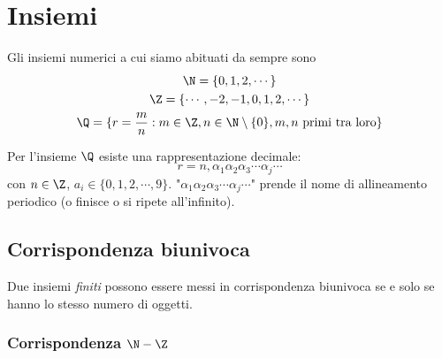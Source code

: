 \section{Insiemi}

Gli insiemi numerici a cui siamo abituati da sempre sono
\begin{gather*}
    \N=\{0, 1, 2, \cdots\}\\
    \Z=\{\cdots, -2, -1, 0, 1, 2, \cdots\}\\
    \Q=\{r=\frac{m}{n}:m \in \Z, n \in \N\setminus\{0\}, m,n \text{ primi tra loro}\}
\end{gather*}

Per l'insieme $ \Q $ esiste una rappresentazione decimale:
\[
    r=n,\alpha_1 \alpha_2 \alpha_3 \cdots\alpha_{j} \cdots
\]
con $ n \in \Z $, $ a_{i} \in\{0, 1, 2,\cdots,9\} $. "$ \alpha_1 \alpha_2 \alpha_3 \cdots\alpha_{j} \cdots $" prende il nome di allineamento periodico (o finisce o si ripete all'infinito).

\subsection{Corrispondenza biunivoca}

Due insiemi \textit{finiti} possono essere messi in corrispondenza biunivoca se e solo se hanno lo stesso numero di oggetti.

\subsubsection{Corrispondenza $ \N-\Z $}

\begin{center}
\end{center}

